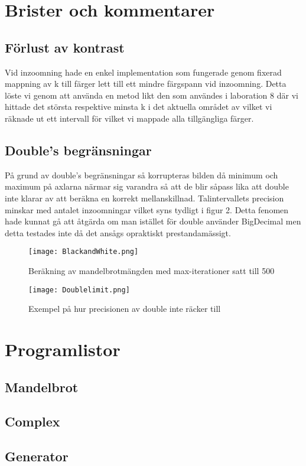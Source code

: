 \documentclass[a4paper]{article}
\begin{document}
\section{Brister och kommentarer}

\subsection{Förlust av kontrast}
Vid inzoomning hade en enkel implementation som fungerade genom fixerad mappning av k till färger lett till ett mindre färgspann vid inzoomning. Detta löste vi genom att använda en metod likt den som användes i laboration 8 där vi hittade det största respektive minsta k i det aktuella området av vilket vi räknade ut ett intervall för vilket vi mappade alla tillgängliga färger.

\subsection{Double's begränsningar}
På grund av double's begränsningar så korrupteras bilden då minimum och maximum på axlarna närmar sig varandra så att de blir såpass lika att double inte klarar av att beräkna en korrekt mellanskillnad. Talintervallets precision minskar med antalet inzoomningar vilket syns tydligt i figur 2. Detta fenomen hade kunnat gå att åtgärda om man istället för double använder BigDecimal men detta testades inte då det ansågs opraktiskt prestandamässigt.

\begin{figure}[bbp]
	\centering
	\texttt{[image: BlackandWhite.png]}
	\caption{Beräkning av mandelbrotmängden med max-iterationer satt till 500}
\end{figure}

\begin{figure}[bbp]
	\centering
	\texttt{[image: Doublelimit.png]}
	\caption{Exempel på hur precisionen av double inte räcker till}
\end{figure}

\section{Programlistor}

\subsection{Mandelbrot}

\subsection{Complex}

\subsection{Generator}
\end{document}
